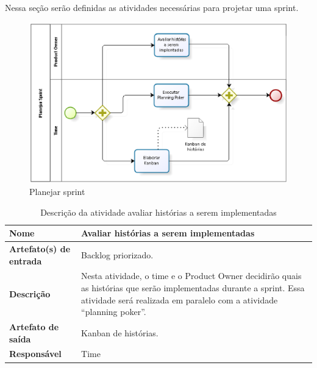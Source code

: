\begin{enumerate}
    Nessa seção serão definidas as atividades necessárias para projetar uma sprint.
    \begin{figure}[H]
        \centering
        \caption{Planejar sprint}
        \label{processoPlanejar}
        \includegraphics[keepaspectratio=true,scale=0.8]{figuras/processoPlanejar.eps}
    \end{figure}

    \begin{table}[H]
        \centering
        \label{descricaoAtividades19}
        \caption{Descrição da atividade avaliar histórias a serem implementadas}
            \begin{tabular}{|l|p{10cm}|}
            \hline
            \textbf{Nome} & Avaliar histórias a serem implementadas \\
            \hline
            \textbf{Artefato(s) de entrada} & Backlog priorizado. \\
            \hline
            \textbf{Descrição} & Nesta atividade, o time e o Product Owner decidirão quais as histórias que serão implementadas durante a sprint. Essa atividade será realizada em paralelo com a atividade “planning poker”. \\
            \hline
            \textbf{Artefato de saída} & Kanban de histórias. \\
            \hline
            \textbf{Responsável} & Time \\
            \hline
        \end{tabular}
    \end{table}


\end{enumerate}
